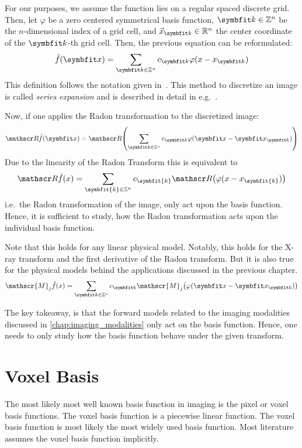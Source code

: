 
For our purposes, we assume the function lies on a regular spaced discrete grid. Then, let
\(\varphi\) be a zero centered symmetrical basis function, \(\mvec{k} \in \mathbb{Z}^n\) be the
\(n\)-dimensional index of a grid cell, and \(\vec{x}_{\mvec{k}} \in \mathbb{R}^n\) the center
coordinate of the \(\mvec{k}\)-th grid cell. Then, the previous equation can be reformulated:
\[ \near{f}(\mvec{x}) = \sum_{\mvec{k} \in \mathbb{Z}^n} c_{\mvec{k}} \varphi(x - x_{\mvec{k}}) \]
This definition follows the notation given in~\cite{momey_new_2011}. This method to discretize an
image is called \textit{series expansion} and is described in detail in
e.g.\ \cite{herman_basis_2015}.

Now, if one applies the Radon transformation to the discretized image: 
\[ \radon\near{f}(\mvec{x}) = \radon\left( \sum_{\mvec{k} \in \mathbb{Z}^n} c_{\mvec{k}} \varphi(\mvec{x} - \mvec{x}_{\mvec{k}}) \right) \]
Due to the linearity of the Radon Transform this is equivalent to
\[ \radon\hat{f}(x) = \sum_{\symbfit{k} \in \mathbb{Z}^n} c_{\symbfit{k}}\radon\left( \varphi(x - x_{\symbfit{k}}) \right) \]
i.e.\ the Radon transformation of the image, only act upon the basis function. Hence, it is
sufficient to study, how the Radon transformation acts upon the individual basis function.

Note that this holds for any linear physical model. Notably, this holds for the X-ray transform and
the first derivative of the Radon transform. But it is also true for the physical models behind the
applications discussed in the previous chapter.
\[ \mathscr{M}_j\near{f}(x) = \sum_{\mvec{k} \in \mathbb{Z}^n} c_{\mvec{k}}\mathscr{M}_j\left( \varphi(\mvec{x} - \mvec{x}_{\mvec{k}}) \right) \]

The key takeaway, is that the forward models related to the imaging modalities discussed in
\autoref{chap:imaging_modalities} only act on the basis function. Hence, one needs to only study how
the basis function behave under the given transform.

\section{Voxel Basis}\label{sec:voxel_basis}

The most likely most well known basis function in imaging is the pixel or voxel basis functions. The
voxel basis function is a piecewise linear function. The voxel basis function is most likely the
most widely used basis function. Most literature assumes the voxel basis function implicitly.

